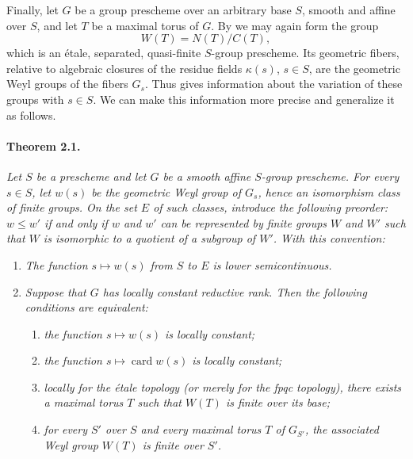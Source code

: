 Finally, let \(G\) be a group prescheme over an arbitrary base \(S\),
smooth and affine over \(S\), and let \(T\) be a maximal torus of
\(G\). By  we may again form the group
\[
  W(T)=N(T)/C(T),
\]
which is an étale, separated, quasi-finite \(S\)-group prescheme. Its
geometric fibers, relative to algebraic closures of the residue
fields \(\kappa(s)\), \(s\in S\), are the geometric Weyl groups of the
fibers \(G_s\). Thus  gives information about the variation of
these groups with \(s\in S\). We can make this information more
precise and generalize it as follows.

\paragraph{\textbf{Theorem 2.1.}}
\emph{Let \(S\) be a prescheme and let \(G\) be a smooth affine
\(S\)-group prescheme. For every \(s\in S\), let \(w(s)\) be the
geometric Weyl group of \(G_s\), hence an isomorphism class of finite
groups. On the set \(E\) of such classes, introduce the following
preorder: \(w\leq w'\) if and only if \(w\) and \(w'\) can be
represented by finite groups \(W\) and \(W'\) such that \(W\) is
isomorphic to a quotient of a subgroup of \(W'\). With this
convention:}
\begin{enumerate}
\renewcommand{\labelenumi}{\alph{enumi})}
\item{} \emph{The function \(s\mapsto w(s)\) from \(S\) to \(E\) is
  lower semicontinuous.}
\item{} \emph{Suppose that \(G\) has locally constant reductive rank.
  Then the following conditions are equivalent:}
  \begin{enumerate}
  \renewcommand{\labelenumii}{(\roman{enumii})}
  \item \emph{the function \(s\mapsto w(s)\) is locally constant;}
  \item[\textup{(i bis)}] \emph{the function
    \(s\mapsto\operatorname{card}w(s)\) is locally constant;}
  \item \emph{locally for the étale topology (or merely for the fpqc
    topology), there exists a maximal torus \(T\) such that \(W(T)\)
    is finite over its base;}
  \item[\textup{(ii bis)}] \emph{for every \(S'\) over \(S\) and
    every maximal torus \(T\) of \(G_{S'}\), the associated Weyl group
    \(W(T)\) is finite over \(S'\).}
  \end{enumerate}
\end{enumerate}

